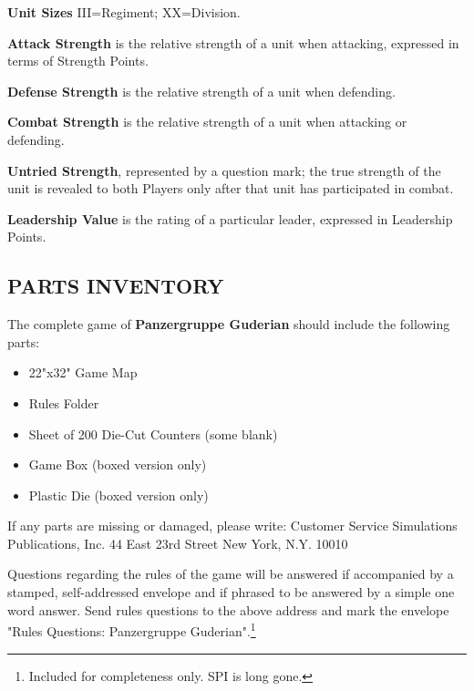 
\textbf{Unit Sizes}
III=Regiment; XX=Division.

\textbf{Attack Strength} is the relative strength of a unit when attacking, expressed in terms of Strength Points.

\textbf{Defense Strength} is the relative strength of a unit when defending.

\textbf{Combat Strength} is the relative strength of a unit when attacking or defending.

\textbf{Untried Strength}, represented by a question mark; the true strength of the unit is revealed to both Players only after that unit has participated in combat.

\textbf{Leadership Value} is the rating of a particular leader, expressed in Leadership Points.

\subsection{PARTS INVENTORY}

The complete game of \textbf{Panzergruppe Guderian} should include the following parts:

\begin{itemize}
  \setlength\itemsep{-0.9em}
  \item 22"x32" Game Map
  \item Rules Folder
  \item Sheet of 200 Die-Cut Counters (some blank)
  \item Game Box (boxed version only)
  \item Plastic Die (boxed version only)
\end{itemize}

If any parts are missing or damaged, please write:
Customer Service
Simulations Publications, Inc.
44 East 23rd Street
New York, N.Y. 10010

Questions regarding the rules of the game will be answered if accompanied by a stamped, self-addressed envelope and if phrased to be answered by a simple one word answer. Send rules questions to the above address and mark the envelope "Rules Questions: Panzergruppe Guderian".\footnote{Included for completeness only. SPI is long gone.}
